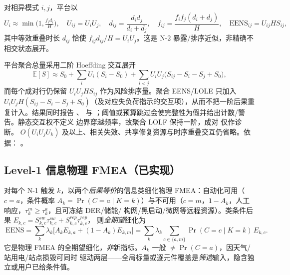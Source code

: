 \begin{proposition}[二阶共故障近似]\label{prop:rel-fa-pair}
对相异模式 $i,j$，平台以
\begin{equation}
 U_i\approx\min\!\Big(1,\tfrac{f_i d_i}{H}\Big),\quad U_{ij}=U_iU_j,\quad
 d_{ij}=\frac{d_id_j}{d_i+d_j},\quad f_{ij}=\frac{f_if_j(d_i+d_j)}{H},\quad
 \mathrm{EENS}_{ij}=U_{ij}HS_{ij},
 \label{eq:rel-fa-pair}
\end{equation}
其中等效重叠时长 $d_{ij}$ 恰使 $f_{ij}d_{ij}/H=U_iU_j$。这是 N-2 暴露/排序近似，非精确不相交状态展开。
\end{proposition}

平台聚合总量采用二阶 Hoeffding 交互展开
\begin{equation}
 \mathbb E[S]\approx S_0+\sum_iU_i(S_i-S_0)+\sum_{i<j}U_iU_j\big(S_{ij}-S_i-S_j+S_0\big),
 \label{eq:rel-fa-exact}
\end{equation}
而每个成对行仍保留 $U_iU_jHS_{ij}$ 作为风险排序量。聚合 EENS/LOLE 只加入
$U_iU_jH(S_{ij}-S_i-S_j+S_0)$（及对应失负荷指示的交互项），从而不把一阶后果重复计入。结果同时报告
、 与
；阈值或预算跳过会使完整性为假并给出计数/警告。静态交互权不定义
边界穿越频率，故聚合 LOLF 保持一阶，成对  仅作诊断。
$O(U_iU_jU_k)$ 及以上、相关失效、共享修复资源与时序重叠交互仍省略。依据：
。

\subsection{Level-1 信息物理 FMEA（已实现）}\label{sec:rel-fa-cyber}
对每个 N-1 触发 $k$，以两个\emph{后果等价}的信息类细化物理 FMEA：自动化可用（$c=a$，条件概率
$A_k=\Pr(C=a\mid K=k)$）与不可用（$c=m$，$1-A_k$，人工响应，$\tau_k^m\ge\tau_k^a$，且可冻结 DER/储能/
构网/黑启动/微网等远程资源）。类条件后果 $E_{k,c}=S_{k,c}^{sw}\tau_{k,c}^{sw}+S_{k,c}^{rep}\tau_{k,c}^{rep}$，
则\emph{全期望}细化为
\begin{equation}
 \boxed{\ \mathrm{EENS}=\sum_k\lambda_k\big[A_kE_{k,a}+(1-A_k)E_{k,m}\big]
 =\sum_k\lambda_k\sum_{c\in\{a,m\}}\Pr(C{=}c\mid K{=}k)\,E_{k,c}.\ }
 \label{eq:rel-fa-cyber}
\end{equation}
它是物理 FMEA 的全期望细化，\emph{非}新指标。$A_k$ 一般 $\ne\Pr(C{=}a)$，因天气/站用电/站点损毁可同时
驱动两层——全局标量或逐元件覆盖是\emph{筛选}输入，隐含独立或用户已给条件值。

